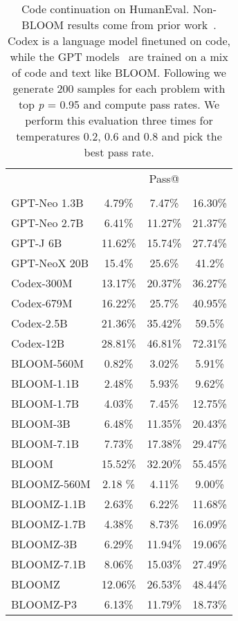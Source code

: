 \documentclass[11pt]{article}
\begin{document}
\begin{table}[h!]
    \centering
    \footnotesize
\begin{tabular}{lccc}
    \toprule
    & \multicolumn{3}{c}{Pass@} \\
    &  &  &  \\
    \midrule
    GPT-Neo 1.3B & 4.79\% & 7.47\% & 16.30\% \\
    GPT-Neo 2.7B & 6.41\% & 11.27\% & 21.37\% \\
    GPT-J 6B & 11.62\% & 15.74\% & 27.74\% \\
    GPT-NeoX 20B & 15.4\% & 25.6\% & 41.2\% \\
    \midrule
    Codex-300M & 13.17\% & 20.37\% & 36.27\% \\
    Codex-679M & 16.22\% & 25.7\% & 40.95\% \\
    Codex-2.5B & 21.36\% & 35.42\% & 59.5\% \\
    Codex-12B & 28.81\% & 46.81\% & 72.31\% \\
    \midrule
    BLOOM-560M & 0.82\% & 3.02\% & 5.91\% \\
    BLOOM-1.1B & 2.48\% & 5.93\% & 9.62\% \\
    BLOOM-1.7B & 4.03\% & 7.45\% & 12.75\% \\
    BLOOM-3B & 6.48\% & 11.35\% & 20.43\% \\
    BLOOM-7.1B & 7.73\% & 17.38\% & 29.47\% \\
    BLOOM & 15.52\% & 32.20\% & 55.45\% \\
    \midrule
    BLOOMZ-560M & 2.18 \% & 4.11\% & 9.00\% \\
    BLOOMZ-1.1B & 2.63\% & 6.22\% & 11.68\% \\
    BLOOMZ-1.7B & 4.38\% & 8.73\% & 16.09\% \\
    BLOOMZ-3B & 6.29\% & 11.94\% & 19.06\% \\
    BLOOMZ-7.1B & 8.06\% & 15.03\% & 27.49\% \\
    BLOOMZ & 12.06\% & 26.53\% & 48.44\% \\
    BLOOMZ-P3 & 6.13\% & 11.79\% & 18.73\% \\
    \bottomrule
    \end{tabular}
\caption{
        Code continuation on HumanEval. Non-BLOOM results come from prior work~\cite{chen2021evaluating,fried2022incoder}. Codex is a language model finetuned on code, while the GPT models~\cite{black2021gpt,wang2021gpt,black2022gpt} are trained on a mix of code and text like BLOOM. Following \citet{chen2021evaluating} we generate 200 samples for each problem with top \emph{p} = 0.95 and compute pass rates. We perform this evaluation three times for temperatures 0.2, 0.6 and 0.8 and pick the best pass rate.
    }
    \label{tab:humaneval}
\end{table}
\end{document}
